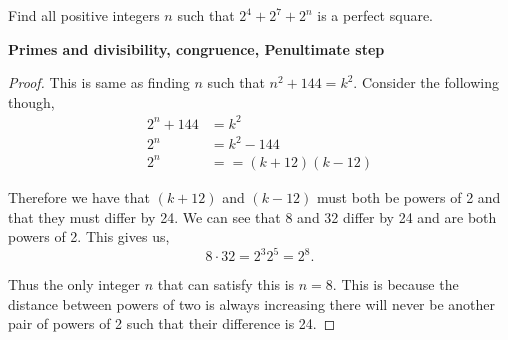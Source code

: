 \documentclass[11pt]{article}
\newenvironment{problem}[2][Problem\!]{\begin{trivlist}
\item[\hskip \labelsep {\bfseries #1}\hskip \labelsep {\bfseries #2}]}{\end{trivlist}}
\begin{document}
\begin{tcolorbox}
    \begin{problem} {IC | 11/12 | 143.}
        Find all positive integers $n$ such that $2^{4} + 2^{7} + 2^{n}$ is a perfect square. 
    \end{problem}
    \textbf{Primes and divisibility, congruence, Penultimate step}
\end{tcolorbox}
\begin{proof}
    This is same as finding $n$ such that $n^{2} + 144 = k^{2}$. Consider the following though,
    \begin{align*}
        2^{n} + 144 &= k^{2} \\
        2^{n} &= k^{2} - 144 \\
        2^{n} &= = (k + 12)(k-12)
    \end{align*}

    Therefore we have that $(k+12)$ and $(k-12)$ must both be powers of 2 and that they must differ by 24. We can see that 8 and 32 differ by 24 and are both powers of 2. This gives us,
    \[8 \cdot 32 = 2^{3}2^{5} = 2^{8}.\]

    Thus the only integer $n$ that can satisfy this is $n = 8$. This is because the distance between powers of two is always increasing there will never be another pair of powers of 2 such that their difference is 24. 
\end{proof}
\end{document}
